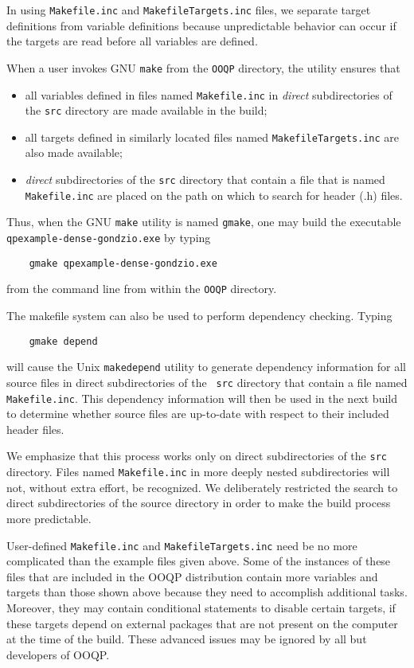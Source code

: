 In using \verb-Makefile.inc- and \verb-MakefileTargets.inc- files, we
separate target definitions from variable definitions because
unpredictable behavior can occur if the targets are read before all
variables are defined.

When a user invokes GNU {\tt make} from the {\tt OOQP} directory, the
utility ensures that
\begin{itemize}
  \item all variables defined in files named \verb-Makefile.inc- in
    {\em direct} subdirectories of the {\tt src} directory are
    made available in the build;

  \item all targets defined in similarly located files named
    \verb-MakefileTargets.inc- are also made available;
    
  \item {\em direct} subdirectories of the {\tt src} directory that
    contain a file that is named \verb-Makefile.inc- are placed on the
    path on which to search for header (.h) files.
\end{itemize}
Thus, when the GNU {\tt make} utility is named \verb-gmake-, one may
build the executable \verb|qpexample-dense-gondzio.exe| by typing
\begin{verbatim}
    gmake qpexample-dense-gondzio.exe
\end{verbatim}
from the command line from within the {\tt OOQP} directory.

The makefile system can also be used to perform dependency checking.
Typing 
\begin{verbatim}
    gmake depend
\end{verbatim}
will cause the Unix \verb-makedepend- utility to generate dependency
information for all source files in direct subdirectories of the {\tt
src} directory that contain a file named \verb-Makefile.inc-.  This
dependency information will then be used in the next build to
determine whether source files are up-to-date with respect to their
included header files.

We emphasize that this process works only on direct subdirectories of
the {\tt src} directory. Files named \verb-Makefile.inc- in more
deeply nested subdirectories will not, without extra effort, be
recognized. We deliberately restricted the search to direct
subdirectories of the source directory in order to make the build
process more predictable.

User-defined \verb-Makefile.inc- and \verb-MakefileTargets.inc- need
be no more complicated than the example files given above. Some of the
instances of these files that are included in the OOQP distribution
contain more variables and targets than those shown above because they
need to accomplish additional tasks. Moreover, they may contain
conditional statements to disable certain targets, if these targets
depend on external packages that are not present on the computer at
the time of the build. These advanced issues may be ignored by all but
developers of OOQP.

